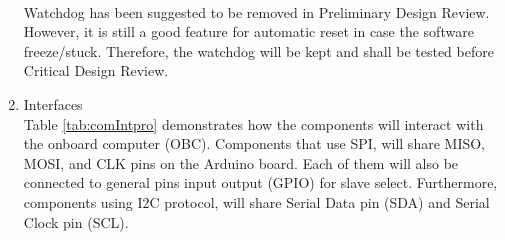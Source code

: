 \begin{enumerate}[label=(\alph*)]
\\
Watchdog has been suggested to be removed in Preliminary Design Review. However, it is still a good feature for automatic reset in case the software freeze/stuck. Therefore, the watchdog will be kept and shall be tested before Critical Design Review.
\item{Interfaces}\\
Table \ref{tab:comIntpro} demonstrates how the components will interact with the onboard computer (OBC). Components that use SPI, will share MISO, MOSI, and CLK pins on the Arduino board. Each of them will also be connected to general pins input output (GPIO) for slave select. Furthermore, components using I2C protocol, will share Serial Data pin (SDA) and Serial Clock pin (SCL).




\end{enumerate}
